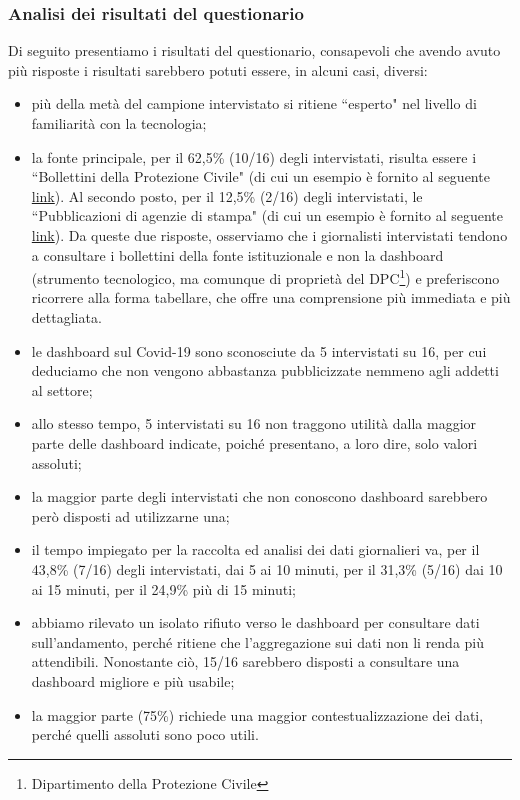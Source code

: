 \subsubsection{Analisi dei risultati del questionario}
\label{sss:analisi-risultati-questionario}
Di seguito presentiamo i risultati del questionario, consapevoli che avendo avuto più risposte i risultati sarebbero potuti essere, in alcuni casi, diversi:
\begin{itemize}
    \item più della metà del campione intervistato si ritiene ``esperto" nel livello di familiarità con la tecnologia;
    \item la fonte principale, per il 62,5\% (10/16) degli intervistati, risulta essere i ``Bollettini della Protezione Civile" (di cui un esempio è fornito al seguente \href{https://github.com/pcm-dpc/COVID-19/blob/master/schede-riepilogative/regioni/dpc-covid19-ita-scheda-regioni-latest.pdf}{link}). Al secondo posto, per il 12,5\% (2/16) degli intervistati, le ``Pubblicazioni di agenzie di stampa" (di cui un esempio è fornito al seguente \href{https://www.ansa.it/canale_saluteebenessere/notizie/sanita/2021/01/02/covid-11.831-nuovi-casi-in-24-ore-364-vittime-_96b5a8cb-4922-492b-87ac-9d9c9590cca4.html}{link}).
    Da queste due risposte, osserviamo che i giornalisti intervistati tendono a consultare i bollettini della fonte istituzionale e non la dashboard (strumento tecnologico, ma comunque di proprietà del DPC\footnote{Dipartimento della Protezione Civile}) e preferiscono ricorrere alla forma tabellare, che offre una comprensione più immediata e più dettagliata.
    \item le dashboard sul Covid-19 sono sconosciute da 5 intervistati su 16, per cui deduciamo che non vengono abbastanza pubblicizzate nemmeno agli addetti al settore;
    \item allo stesso tempo, 5 intervistati su 16 non traggono utilità dalla maggior parte delle dashboard indicate, poiché presentano, a loro dire, solo valori assoluti;
    \item la maggior parte degli intervistati che non conoscono dashboard sarebbero però disposti ad utilizzarne una;
    \item il tempo impiegato per la raccolta ed analisi dei dati giornalieri va, per il 43,8\% (7/16) degli intervistati, dai 5 ai 10 minuti, per il 31,3\% (5/16) dai 10 ai 15 minuti, per il 24,9\% più di 15 minuti;
    \item abbiamo rilevato un isolato rifiuto verso le dashboard per consultare dati sull'andamento, perché ritiene che l'aggregazione sui dati non li renda più attendibili. Nonostante ciò, 15/16 sarebbero disposti a consultare una dashboard migliore e più usabile;
    \item la maggior parte (75\%) richiede una maggior contestualizzazione dei dati, perché quelli assoluti sono poco utili.
\end{itemize}

